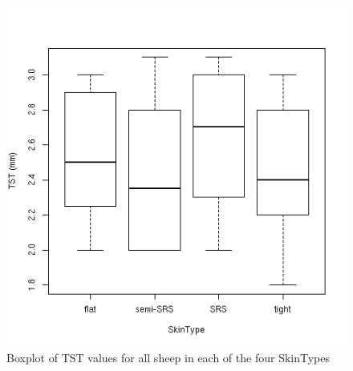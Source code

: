 %

\begin{figure}[!h]
  \centering
  \includegraphics[width=1.0\textwidth]{TSTskintype.png}
  \caption{Boxplot of TST values for all sheep in each of the four SkinTypes}
  \label{fig:TSTskintype}
\end{figure}

%

